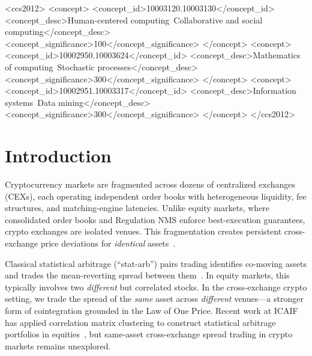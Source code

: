 \documentclass[sigconf,nonacm=false]{acmart}
\begin{document}
\begin{CCSXML}
<ccs2012>
  <concept>
    <concept_id>10003120.10003130</concept_id>
    <concept_desc>Human-centered computing~Collaborative and social computing</concept_desc>
    <concept_significance>100</concept_significance>
  </concept>
  <concept>
    <concept_id>10002950.10003624</concept_id>
    <concept_desc>Mathematics of computing~Stochastic processes</concept_desc>
    <concept_significance>300</concept_significance>
  </concept>
  <concept>
    <concept_id>10002951.10003317</concept_id>
    <concept_desc>Information systems~Data mining</concept_desc>
    <concept_significance>300</concept_significance>
  </concept>
</ccs2012>
\end{CCSXML}



\maketitle

\section{Introduction}\label{sec:intro}

Cryptocurrency markets are fragmented across dozens of centralized exchanges (CEXs), each operating independent order books with heterogeneous liquidity, fee structures, and matching-engine latencies. Unlike equity markets, where consolidated order books and Regulation NMS enforce best-execution guarantees, crypto exchanges are isolated venues. This fragmentation creates persistent cross-exchange price deviations for \emph{identical} assets~\cite{makarov2020trading}.

Classical statistical arbitrage (``stat-arb'') pairs trading identifies co-moving assets and trades the mean-reverting spread between them~\cite{krauss2017statistical}. In equity markets, this typically involves two \emph{different} but correlated stocks. In the cross-exchange crypto setting, we trade the spread of the \emph{same} asset across \emph{different} venues---a stronger form of cointegration grounded in the Law of One Price. Recent work at ICAIF has applied correlation matrix clustering to construct statistical arbitrage portfolios in equities~\cite{jin2023correlation}, but same-asset cross-exchange spread trading in crypto markets remains unexplored.
\end{document}
